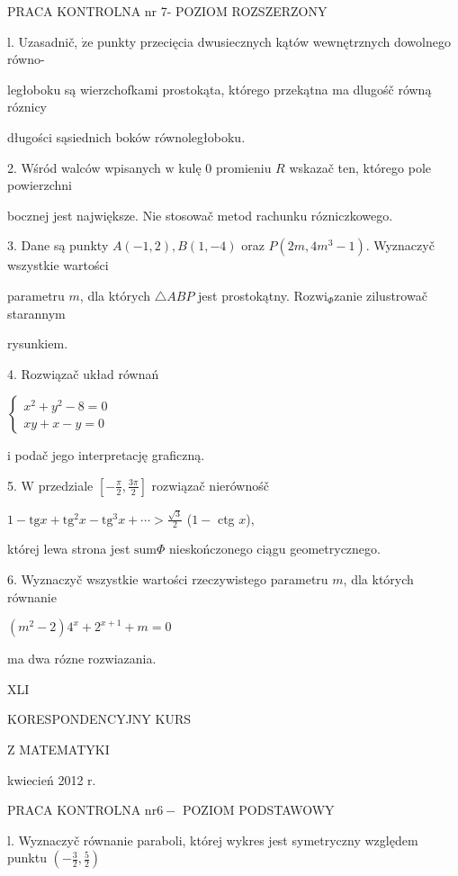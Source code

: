 \documentclass[a4paper,12pt]{article}
\begin{document}
PRACA KONTROLNA nr 7- POZIOM ROZSZERZONY

l. Uzasadnič, $\dot{\mathrm{z}}\mathrm{e}$ punkty przecięcia dwusiecznych kątów wewnętrznych dowolnego równo-

ległoboku są wierzchofkami prostokąta, którego przekątna ma dlugośč równą róznicy

długości sąsiednich boków równoległoboku.

2. Wśród walców wpisanych $\mathrm{w}$ kulę $0$ promieniu $R$ wskazač ten, którego pole powierzchni

bocznej jest największe. Nie stosowač metod rachunku rózniczkowego.

3. Dane są punkty $A(-1,2), B(1,-4)$ oraz $P(2m,4m^{3}-1)$. Wyznaczyč wszystkie wartości

parametru $m$, dla których $\triangle ABP$ jest prostokątny. $\mathrm{R}\mathrm{o}\mathrm{z}\mathrm{w}\mathrm{i}_{\Phi}$zanie zilustrowač starannym

rysunkiem.

4. Rozwiązač układ równań

$\left\{\begin{array}{l}
x^{2}+y^{2}-8=0\\
xy+x-y=0
\end{array}\right.$

$\mathrm{i}$ podač jego interpretację graficzną.

5. $\mathrm{W}$ przedziale $[-\displaystyle \frac{\pi}{2},\frac{3\pi}{2}]$ rozwiązač nierównośč

$1-\displaystyle \mathrm{t}\mathrm{g}x+\mathrm{t}\mathrm{g}^{2}x-\mathrm{t}\mathrm{g}^{3}x+\cdots>\frac{\sqrt{3}}{2}$ ($1-$ ctg $x$),

której lewa strona jest $\mathrm{s}\mathrm{u}\mathrm{m}\Phi$ nieskończonego ciągu geometrycznego.

6. Wyznaczyč wszystkie wartości rzeczywistego parametru $m$, dla których równanie

$(m^{2}-2)4^{x}+2^{x+1}+m=0$

ma dwa rózne rozwiazania.





XLI

KORESPONDENCYJNY KURS

Z MATEMATYKI

kwiecień 2012 r.

PRACA KONTROLNA $\mathrm{n}\mathrm{r} 6-$ POZIOM PODSTAWOWY

l. Wyznaczyč równanie paraboli, której wykres jest symetryczny względem punktu $(-\displaystyle \frac{3}{2},\frac{5}{2})$
\end{document}
